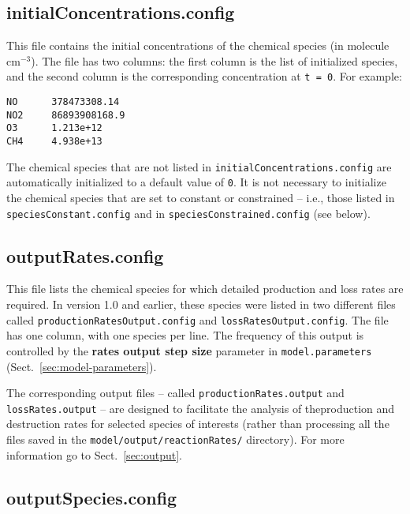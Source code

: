 \subsection{initialConcentrations.config} \label{subsec:initialconcentrations}

This file contains the initial concentrations of the chemical species
(in molecule cm$^{-3}$). The file has two columns: the first
column is the list of initialized species, and the second column is
the corresponding concentration at \texttt{t\ =\ 0}. For example:

\begin{verbatim}
NO      378473308.14
NO2     86893908168.9
O3      1.213e+12
CH4     4.938e+13
\end{verbatim}

The chemical species that are not listed in
\texttt{initialConcentrations.config} are automatically initialized to
a default value of \texttt{0}. It is not necessary to initialize the
chemical species that are set to constant or constrained -- i.e.,
those listed in \texttt{speciesConstant.config} and in
\texttt{speciesConstrained.config} (see below).

\subsection{outputRates.config} \label{subsec:outputrates}

This file lists the chemical species for which detailed production and
loss rates are required. In version 1.0 and earlier, these species
were listed in two different files called
\texttt{productionRatesOutput.config} and \texttt{lossRatesOutput.config}.
The file has one column, with one species per line. The frequency of
this output is controlled by the \textbf{rates output step size}
parameter in \texttt{model.parameters} (Sect.~\ref{sec:model-parameters}).

The corresponding output files -- called \texttt{productionRates.output}
and \texttt{lossRates.output} -- are designed to facilitate the
analysis of theproduction and destruction rates for selected species of
interests (rather than processing all the files saved in the
\texttt{model/output/reactionRates/} directory). For more information
go to Sect.~\ref{sec:output}.

\subsection{outputSpecies.config} \label{subsec:outputspecies}

